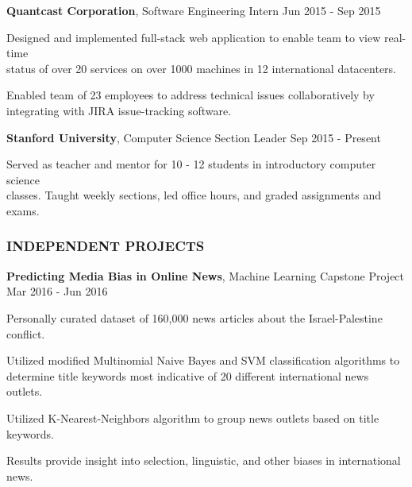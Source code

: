 \documentclass[11pt,letterpaper]{article}%
\begin{document}
\vspace{-.3em}
\hspace{.6em} 
{\bf Quantcast Corporation}, Software Engineering Intern \hfill Jun 2015 - Sep 2015
\vspace{-.6em}
\begin{itemize*}
\item Designed and implemented full-stack web application to enable team to view real-time \\ status of over 20 services on over 1000 machines in 12 international datacenters. 
\item Enabled team of 23 employees to address technical issues collaboratively by \\ integrating with JIRA issue-tracking software.
\end{itemize*}

\vspace{-.3em}
\hspace{.6em} 
{\bf Stanford University}, Computer Science Section Leader \hfill Sep 2015 - Present
\vspace{-.6em}
\begin{itemize*}
\item Served as teacher and mentor for 10 - 12 students in introductory computer science \\ classes. Taught weekly sections, led office hours, and graded assignments and exams.
\end{itemize*} 

\vspace{-1em}
\hrulefill 
\subsubsection*{INDEPENDENT PROJECTS}

\vspace{.3em}
\hspace{0.6em}
{\bf Predicting Media Bias in Online News}, Machine Learning Capstone Project \hfill Mar 2016 - Jun 2016
\vspace{-.6em}
\begin{itemize*}
\item Personally curated dataset of 160,000 news articles about the Israel-Palestine conflict.
\item Utilized modified Multinomial Naive Bayes and SVM classification algorithms
to \\ determine title keywords most indicative of 20 different international news outlets.
\item Utilized K-Nearest-Neighbors algorithm to group news outlets based on title keywords.
\item Results provide insight into selection, linguistic, and other biases in international news.
\end{itemize*}
\end{document}
